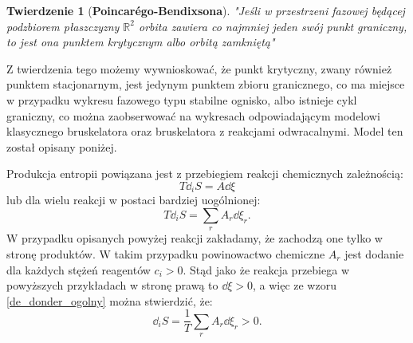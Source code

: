 \documentclass[10pt, a4paper, twoside, onecolumn]{article}
\numberwithin{equation}{section}
\newtheorem*{theorem}{Twierdzenie}
\begin{document}
	\begin{theorem}[\textbf{Poincar\'{e}go-Bendixsona}]
		"Jeśli w przestrzeni fazowej będącej podzbiorem płaszczyzny \(\mathbb{R}^{2}\) orbita zawiera co najmniej jeden swój punkt graniczny, to jest ona punktem krytycznym albo orbitą zamkniętą" \cite{palczewski}
	\end{theorem}
	Z twierdzenia tego możemy wywnioskować, że punkt krytyczny, zwany również punktem stacjonarnym, jest jedynym punktem zbioru granicznego, co ma miejsce w przypadku wykresu fazowego typu stabilne ognisko, albo istnieje cykl graniczny, co można zaobserwować na wykresach odpowiadającym modelowi klasycznego bruskelatora oraz bruskelatora z reakcjami odwracalnymi. Model ten został opisany poniżej. \par
	Produkcja entropii powiązana jest z przebiegiem reakcji chemicznych zależnością:
	\begin{equation}\label{de_donder}
		T\dd_{i}S=A\dd{\xi}
	\end{equation}
	lub dla wielu reakcji w postaci bardziej uogólnionej: 
	\begin{equation}\label{de_donder_ogolny}
		T\dd_{i}S=\sum_{r}A_{r}\dd{\xi_{r}}.
	\end{equation}
	W przypadku opisanych powyżej reakcji zakładamy, że zachodzą one tylko w stronę produktów. W takim przypadku powinowactwo chemiczne $A_{r}$ jest dodanie dla każdych stężeń reagentów \(c_{i}>0\). Stąd jako że reakcja przebiega w powyższych przykładach w stronę prawą to \(\dd{\xi}>0\), a więc ze wzoru \eqref{de_donder_ogolny} można stwierdzić, że:
	\begin{equation}
		\dd_{i}S=\frac{1}{T}\sum_{r}A_{r}\dd{\xi_{r}}>0.
	\end{equation}
\end{document}
